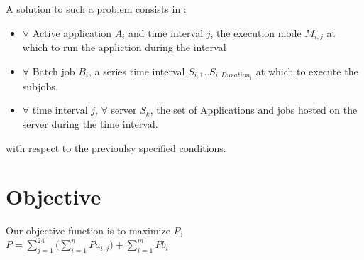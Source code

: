\documentclass[a4paper]{article}
\begin{document}
A solution to such a problem consists in :
\begin{itemize}
\item $\forall$ Active application $A_i$ and time interval $j$, the execution mode $M_{i,j}$ at which to run the appliction during the interval
\item $\forall$ Batch job $B_i$, a series time interval $S_{i,1}..S_{i, Duration_i}$ at which to execute the subjobs.
\item $\forall$ time interval $j$, $\forall$ server $S_k $, the set of Applications and jobs hosted on the server during the time interval.
\end{itemize}
with respect to the previoulsy specified conditions.


\section{Objective}
Our objective function is to maximize $P$,\\
$P= \sum_{j=1}^{24} \bigg( \sum_{i=1}^{n} {Pa_{i,j}}\bigg)  + \sum_{i=1}^{m} Pb_i$
\end{document}
